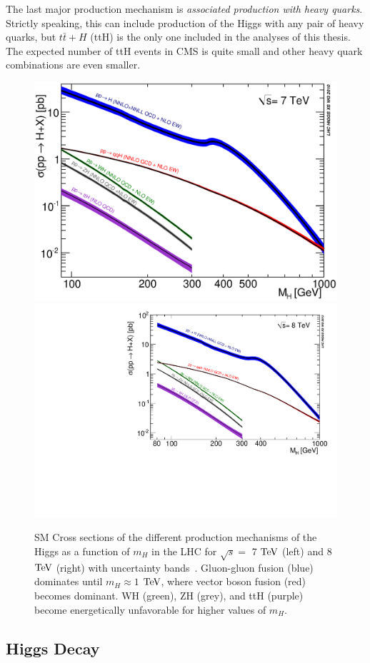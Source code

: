 The last major production mechanism is \textit{associated production with heavy quarks}. Strictly speaking, this can include production of the Higgs with any pair of heavy quarks, but $t\bar{t}+H$ (ttH) is the only one included in the analyses of this thesis. The expected number of ttH events in CMS is quite small and other heavy quark combinations are even smaller.

\begin{figure}[htbp]
\begin{center}
\includegraphics[width=.45\linewidth]{Phenomenology/figures/Higgs_XS_7TeV}
\includegraphics[width=.45\linewidth]{Phenomenology/figures/Higgs_XS_8TeV_lx.pdf}
\caption[Standard Model Production Mechanism of the Higgs at the LHC as a Function of the Higgs' Mass]{SM Cross sections of the different production mechanisms of the Higgs as a function of $m_H$ in the LHC for $\sqrt{s}=$ 7 $\rm{TeV}$ (left) and 8 $\rm{TeV}$ (right) with uncertainty bands~\cite{HXSWG}. Gluon-gluon fusion (blue) dominates until $m_H \approx 1$ $\rm{TeV}$, where vector boson fusion (red) becomes dominant. WH (green), ZH (grey), and ttH (purple) become energetically unfavorable for higher values of $m_H$.}
\label{fig:HXSWGProduction}
\end{center}
\end{figure}

\subsection{Higgs Decay}
\label{sec:HiggsDecay}

